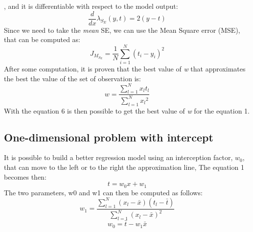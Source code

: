 \documentclass[10pt]{article}
\begin{document}
, and it is differentiable with respect to the
model output:
\begin{equation}
     \frac{d}{dx}\lambda_S_E\left(y,t\right)=2\left(y-t\right)
\end{equation}
Since we need to take the \textit{mean} SE, we can use the Mean Square error (MSE), that can be computed as:
\begin{equation}
     J_M_S_E=\frac{1}{N}\sum_{i=1}^{N}{\left(t_i - y_i\right)^{2}}
\end{equation}
After some computation, it is proven that the best value of
\textit{w} that approximates the best the value of the set of observation
is:
\begin{equation}
     w=\frac{\sum_{l=1}^{N}{x_l t_l}}{\sum_{l=1}^{N}{x_l}^2}
\end{equation}
With the equation 6 is then possible to get the best value
of \textit{w} for the equation 1.
\subsection{One-dimensional problem with intercept}
It is possible to build a better regression model using an
interception factor, $w_0$, that can move to the left or to the
right the approximation line, The equation 1 becomes then:
\begin{equation}
    t = w_0 x + w_1
\end{equation}
The two parameters, w0 and w1 can then be computed as follows:
\begin{equation}
     w_1=\frac{\sum_{l=1}^{N}{\left(x_l - \bar{x}\right)\left(t_l - \bar{t}\right)}}{\sum_{l=1}^{N}{\left(x_l - \bar{x}\right)}^2}
\end{equation}
\begin{equation}
    w_0 = \bar{t} - w_1 \bar{x}
\end{equation}
\end{document}
